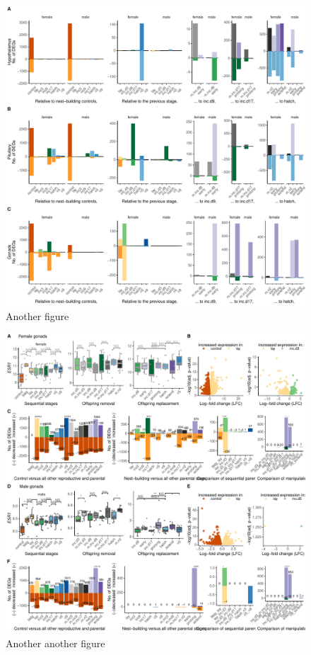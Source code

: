 \begin{figure}[h]
  \centering
  \includegraphics[width=1.0\textwidth]{../../figures/fig3-1}
  \caption{Another figure}
  \label{figure:fig3}
\end{figure}

\newpage

\begin{figure}[ht]
  \centering
  \includegraphics[width=1.0\textwidth]{../../figures/fig4-1}
  \caption{Another another figure}
  \label{figure:fig4}
\end{figure}

